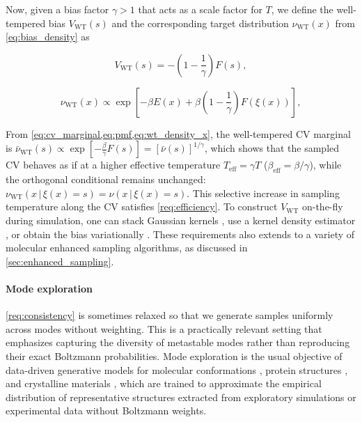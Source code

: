 \documentclass[]{fairmeta}
\theoremstyle{remark}
\begin{document}
Now, given a bias factor $\gamma > 1$ that acts as a scale factor for $T$, we define the well-tempered bias $V_\text{WT}(s)$ and the corresponding target distribution $\nu_\text{WT}(x)$ from \cref{eq:bias_density} as

\begin{minipage}{.4\linewidth}
\begin{equation}
V_\text{WT}(s) = -(1 - \frac{1}{\gamma})F(s),
\label{eq:wt_bias}
\end{equation}
\end{minipage}%
\begin{minipage}{.6\linewidth}
\begin{equation}
\nu_\text{WT}(x) \propto \exp[-\beta E(x) + \beta (1 - \frac{1}{\gamma}) F(\xi(x))],
\label{eq:wt_density_x}
\end{equation}
\end{minipage}

From \cref{eq:cv_marginal,eq:pmf,eq:wt_density_x}, the well-tempered CV marginal is $\bar{\nu}_\text{WT}(s) \propto \exp[-\frac{\beta}{\gamma} F(s)] = [\bar{\nu}(s)]^{1/\gamma}$, which shows that the sampled CV behaves as if at a higher effective temperature $T_\text{eff} = \gamma T$ ($\beta_\text{eff} = \beta / \gamma$), while the orthogonal conditional remains unchanged: $\nu_\text{WT}(x \,|\,\xi(x)=s) = \nu(x\,|\,\xi(x)=s)$.
This selective increase in sampling temperature along the CV satisfies \cref{req:efficiency}.
To construct $V_\text{WT}$ on-the-fly during simulation, one can stack Gaussian kernels \citep{barducci2008well}, use a kernel density estimator \citep{invernizzi2020rethinking}, or obtain the bias variationally \citep{valsson2014variational,bonati2019neural}.
These requirements also extends to a variety of molecular enhanced sampling algorithms, as discussed in \cref{sec:enhanced_sampling}.

\paragraph{Mode exploration} \cref{req:consistency} is sometimes relaxed so that we generate samples uniformly across modes without weighting. This is a practically relevant setting that emphasizes capturing the diversity of metastable modes rather than reproducing their exact Boltzmann probabilities.
Mode exploration is the usual objective of data-driven generative models for molecular conformations \citep{jing2022torsional}, protein structures \citep{watson2023novo}, and crystalline materials \citep{jiao2023crystal,miller2024flowmm}, which are trained to approximate the empirical distribution of representative structures extracted from exploratory simulations or experimental data without Boltzmann weights.
\end{document}
